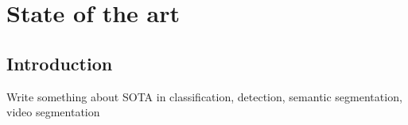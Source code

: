 \chapter{State of the art}

\section{Introduction}\label{sec:i}
Write something about SOTA in classification, detection, semantic segmentation, video segmentation


